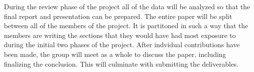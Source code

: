 During the review phase of the project all of the data will be analyzed so that
the final report and presentation can be prepared. The entire paper will be
split between all of the members of the project. It is partitoned in such a way
that the members are writing the sections that they would have had most exposure
to during the initial two phases of the project. After indvidual contributions
have been made, the group will meet as a whole to discuss the paper, including
finalizing the conclusion. This will culminate with submitting the deliverables.

